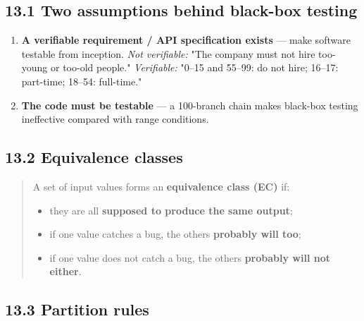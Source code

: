 \begin{studycolumns}
\vspace{0pt}



\subsection*{13.1 Two assumptions behind black-box testing}
\begin{enumerate}
\item \textbf{A verifiable requirement /\allowbreak{} API specification exists} --- make software testable from inception. \emph{Not verifiable:} "The company must not hire too-young or too-old people." \emph{Verifiable:} "0--15 and 55--99: do not hire; 16--17: part-time; 18--54: full-time."
\item \textbf{The code must be testable} --- a 100-branch  chain makes black-box testing ineffective compared with range conditions.
\end{enumerate}
\subsection*{13.2 Equivalence classes}

\begin{quote}\small\color{navy}
A set of input values forms an \textbf{equivalence class (EC)} if:

\begin{itemize}
\item they are all \textbf{supposed to produce the same output};
\item if one value catches a bug, the others \textbf{probably will too};
\item if one value does not catch a bug, the others \textbf{probably will not either}.
\end{itemize}
\end{quote}
\end{studycolumns}

\subsection*{13.3 Partition rules}


